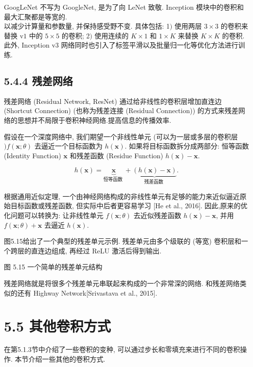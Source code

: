 \documentclass[10pt]{article}
\begin{document}
GoogLeNet 不写为 GoogleNet, 是为了向 LeNet 致敬. Inception 模块中的卷积和最大汇聚都是等宽的.\\
以减少计算量和参数量, 并保持感受野不变. 具体包括: 1$)$ 使用两层 $3 \times 3$ 的卷积来替换 $\mathrm{v} 1$ 中的 $5 \times 5$ 的卷积; 2$)$ 使用连续的 $K \times 1$ 和 $1 \times K$ 来替换 $K \times K$ 的卷积.此外, Inception v3 网络同时也引入了标签平滑以及批量归一化等优化方法进行训练.

\subsection*{5.4.4 残差网络}
残差网络 (Residual Network, ResNet) 通过给非线性的卷积层增加直连边 (Shortcut Connection) (也称为残差连接 (Residual Connection)) 的方式来残差网络的思想并不局限于卷积神经网络.提高信息的传播效率.

假设在一个深度网络中, 我们期望一个非线性单元 (可以为一层或多层的卷积层 $) f(\boldsymbol{x} ; \theta)$ 去逼近一个目标函数为 $h(\boldsymbol{x})$. 如果将目标函数拆分成两部分: 恒等函数 (Identity Function) $\boldsymbol{x}$ 和残差函数 (Residue Function) $h(\boldsymbol{x})-\boldsymbol{x}$.


\begin{equation*}
h(\boldsymbol{x})=\underbrace{\boldsymbol{x}}_{\text {恒等函数 }}+\underbrace{(h(\boldsymbol{x})-\boldsymbol{x})}_{\text {残差函数 }} . \tag{5.41}
\end{equation*}


根据通用近似定理, 一个由神经网络构成的非线性单元有足够的能力来近似逼近原始目标函数或残差函数, 但实际中后者更容易学习 [He et al., 2016]. 因此,原来的优化问题可以转换为: 让非线性单元 $f(\boldsymbol{x} ; \theta)$ 去近似残差函数 $h(\boldsymbol{x})-\boldsymbol{x}$, 并用 $f(\boldsymbol{x} ; \theta)+\boldsymbol{x}$ 去逼近 $h(\boldsymbol{x})$.

图5.15给出了一个典型的残差单元示例. 残差单元由多个级联的 (等宽) 卷积层和一个跨层的直连边组成, 再经过 ReLU 激活后得到输出.



图 5.15 一个简单的残差单元结构

残差网络就是将很多个残差单元串联起来构成的一个非常深的网络. 和残差网络类似的还有 Highway Network[Srivastava et al., 2015].

\section*{5.5 其他卷积方式}
在第5.1.3节中介绍了一些卷积的变种, 可以通过步长和零填充来进行不同的卷积操作. 本节介绍一些其他的卷积方式.
\end{document}
